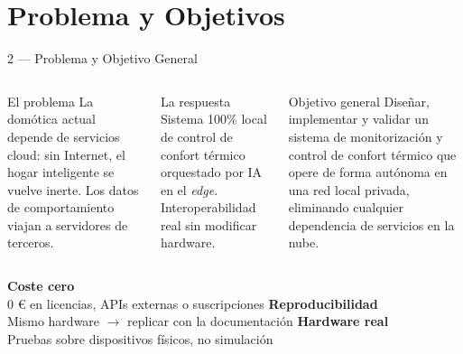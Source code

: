 \section{Problema y Objetivos}

\begin{frame}{2 — Problema y Objetivo General}
  \hypertarget{s:problema}{}
  \begin{columns}[T]
    \begin{alertblock}{El problema}
      \footnotesize
      La domótica actual depende de servicios cloud: sin Internet,
      el hogar inteligente se vuelve inerte. Los datos de comportamiento
      viajan a servidores de terceros.
    \end{alertblock}

    \begin{exampleblock}{La respuesta}
      \footnotesize
      Sistema 100\% local de control de confort térmico orquestado
      por IA en el \textit{edge}. Interoperabilidad real sin modificar hardware.
    \end{exampleblock}

    \begin{block}{Objetivo general}
      \centering
      Diseñar, implementar y validar un sistema de monitorización
      y control de confort térmico que opere de forma autónoma
      en una red local privada, eliminando cualquier dependencia
      de servicios en la nube.
    \end{block}
  \end{columns}

  \vspace{0.4cm}
  \begin{columns}[T]
    \centering
    \textcolor{primary}{\textbf{Coste cero}}\\[0.1cm]
    {\footnotesize 0 € en licencias, APIs externas o suscripciones}
    \centering
    \textcolor{primary}{\textbf{Reproducibilidad}}\\[0.1cm]
    {\footnotesize Mismo hardware $\rightarrow$ replicar con la documentación}
    \centering
    \textcolor{primary}{\textbf{Hardware real}}\\[0.1cm]
    {\footnotesize Pruebas sobre dispositivos físicos, no simulación}
  \end{columns}
\end{frame}

